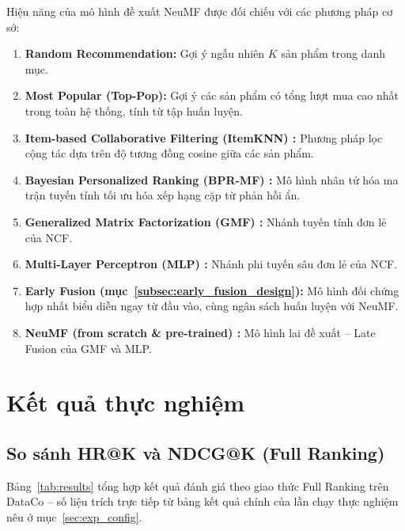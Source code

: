 Hiệu năng của mô hình đề xuất NeuMF được đối chiếu với các phương pháp cơ sở:
\begin{enumerate}
    \item \textbf{Random Recommendation:} Gợi ý ngẫu nhiên $K$ sản phẩm trong danh mục.
    \item \textbf{Most Popular (Top-Pop):} Gợi ý các sản phẩm có tổng lượt mua cao nhất trong toàn hệ thống, tính từ tập huấn luyện.
    \item \textbf{Item-based Collaborative Filtering (ItemKNN) \cite{sarwar2001item}:} Phương pháp lọc cộng tác dựa trên độ tương đồng cosine giữa các sản phẩm.
    \item \textbf{Bayesian Personalized Ranking (BPR-MF) \cite{rendle2009bpr}:} Mô hình nhân tử hóa ma trận tuyến tính tối ưu hóa xếp hạng cặp từ phản hồi ẩn.
    \item \textbf{Generalized Matrix Factorization (GMF) \cite{he2017ncf}:} Nhánh tuyến tính đơn lẻ của NCF.
    \item \textbf{Multi-Layer Perceptron (MLP) \cite{he2017ncf}:} Nhánh phi tuyến sâu đơn lẻ của NCF.
    \item \textbf{Early Fusion (mục~\ref{subsec:early_fusion_design}):} Mô hình đối chứng hợp nhất biểu diễn ngay từ đầu vào, cùng ngân sách huấn luyện với NeuMF.
    \item \textbf{NeuMF (from scratch \& pre-trained) \cite{he2017ncf}:} Mô hình lai đề xuất -- Late Fusion của GMF và MLP.
\end{enumerate}

\section{Kết quả thực nghiệm}
\label{sec:exp_results}

\subsection{So sánh HR@K và NDCG@K (Full Ranking)}
\label{subsec:hr_ndcg_comparison}

Bảng~\ref{tab:results} tổng hợp kết quả đánh giá theo giao thức Full Ranking trên DataCo -- số liệu trích trực tiếp từ bảng kết quả chính của lần chạy thực nghiệm nêu ở mục~\ref{sec:exp_config}.

